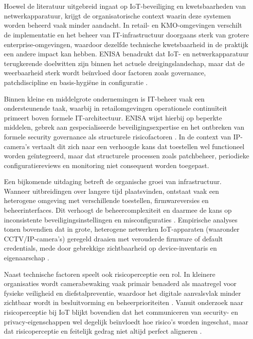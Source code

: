\section{}%
\label{sec:retail-kmo}

Hoewel de literatuur uitgebreid ingaat op IoT-beveiliging en kwetsbaarheden van netwerkapparatuur, krijgt de organisatorische context waarin deze systemen worden beheerd vaak minder aandacht. In retail- en KMO-omgevingen verschilt de implementatie en het beheer van IT-infrastructuur doorgaans sterk van grotere enterprise-omgevingen, waardoor dezelfde technische kwetsbaarheid in de praktijk een andere impact kan hebben. ENISA benadrukt dat IoT- en netwerkapparatuur terugkerende doelwitten zijn binnen het actuele dreigingslandschap, maar dat de weerbaarheid sterk wordt beïnvloed door factoren zoals governance, patchdiscipline en basis-hygiëne in configuratie \autocite{ENISA2024ThreatLandscape}.

Binnen kleine en middelgrote ondernemingen is IT-beheer vaak een ondersteunende taak, waarbij in retailomgevingen operationele continuïteit primeert boven formele IT-architectuur. ENISA wijst hierbij op beperkte middelen, gebrek aan gespecialiseerde beveiligingsexpertise en het ontbreken van formele security governance als structurele risicofactoren \autocite{ENISA2024ThreatLandscape}. In de context van IP-camera’s vertaalt dit zich naar een verhoogde kans dat toestellen wel functioneel worden geïntegreerd, maar dat structurele processen zoals patchbeheer, periodieke configuratiereviews en monitoring niet consequent worden toegepast.

Een bijkomende uitdaging betreft de organische groei van infrastructuur. Wanneer uitbreidingen over langere tijd plaatsvinden, ontstaat vaak een heterogene omgeving met verschillende toestellen, firmwareversies en beheerinterfaces. Dit verhoogt de beheercomplexiteit en daarmee de kans op inconsistente beveiligingsinstellingen en misconfiguraties \autocite{Butun2019arXivIoTSecurity}. Empirische analyses tonen bovendien dat in grote, heterogene netwerken IoT-apparaten (waaronder CCTV/IP-camera’s) geregeld draaien met verouderde firmware of default credentials, mede door gebrekkige zichtbaarheid op device-inventaris en eigenaarschap \autocite{agarwal2019detecting}.

Naast technische factoren speelt ook risicoperceptie een rol. In kleinere organisaties wordt camerabewaking vaak primair benaderd als maatregel voor fysieke veiligheid en diefstalpreventie, waardoor het digitale aanvalsvlak minder zichtbaar wordt in besluitvorming en beheerprioriteiten \autocite{ENISA2024ThreatLandscape}. Vanuit onderzoek naar risicoperceptie bij IoT blijkt bovendien dat het communiceren van security- en privacy-eigenschappen wel degelijk beïnvloedt hoe risico’s worden ingeschat, maar dat risicoperceptie en feitelijk gedrag niet altijd perfect aligneren \autocite{emami2021privacy}.

